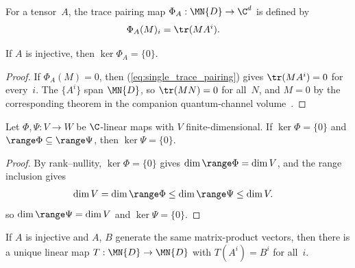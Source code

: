\begin{definition}\label{def:trace_pairing_map}
    \leanok
    For a tensor~$A$, the trace pairing map $\Phi_A : \MN{D} \to \C^d$ is
    defined by
    \begin{align}
        \Phi_A(M)_i
         & = \tr(M A^i).
        \label{eq:single_trace_pairing}
    \end{align}
\end{definition}

\begin{lemma}%
    \label{thm:trace_pairing_injective}
    \leanok
    If $A$ is injective, then $\ker \Phi_A = \{0\}$.
\end{lemma}

\begin{proof}
    \leanok
    If $\Phi_A(M) = 0$, then (\ref{eq:single_trace_pairing}) gives
    $\tr(M A^i) = 0$ for every~$i$. The $\{A^i\}$ span $\MN{D}$, so
    $\tr(M N) = 0$ for all~$N$, and $M = 0$ by
    the corresponding theorem in the companion quantum-channel volume~\cite[``Nondegeneracy of the trace pairing'']{QICLean2026Blueprint}.
\end{proof}

\begin{lemma}%
    \label{lem:injectivity_transfer}
    \leanok
    Let $\Phi, \Psi : V \to W$ be $\C$-linear maps with $V$ finite-dimensional.
    If $\ker \Phi = \{0\}$ and $\range \Phi \subseteq
        \range \Psi$, then $\ker \Psi = \{0\}$.
\end{lemma}

\begin{proof}
    \leanok
    By rank--nullity, $\ker \Phi = \{0\}$ gives
    $\dim \range \Phi = \dim V$, and the range inclusion gives
    \begin{align}
        \dim V & = \dim \range \Phi \le \dim \range \Psi \le \dim V.
        \notag
    \end{align}
    so $\dim \range \Psi = \dim V$ and $\ker \Psi = \{0\}$.
\end{proof}

\begin{lemma}\label{thm:linear_ext}
    \leanok
    If $A$ is injective and $A$, $B$ generate the same matrix-product vectors,
    then there is a unique linear map $T : \MN{D} \to \MN{D}$ with
    $T(A^i) = B^i$ for all~$i$.
\end{lemma}

